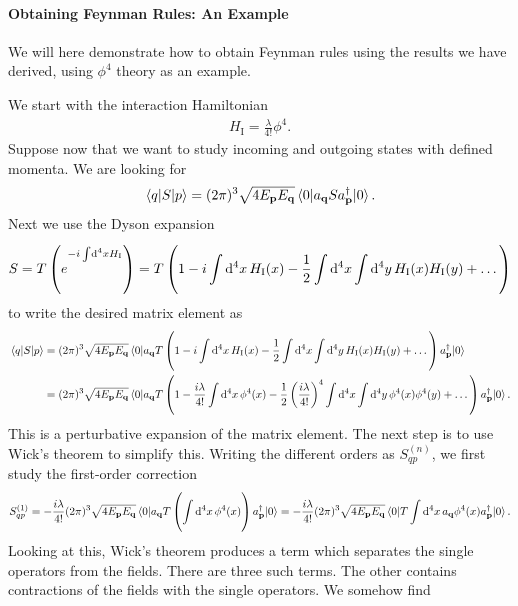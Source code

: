 \paragraph{Obtaining Feynman Rules: An Example}
We will here demonstrate how to obtain Feynman rules using the results we have derived, using $\phi^{4}$ theory as an example.

We start with the interaction Hamiltonian
\begin{align*}
	H_{\text{I}} = \frac{\lambda}{4!}\phi^{4}.
\end{align*}
Suppose now that we want to study incoming and outgoing states with defined momenta. We are looking for
\begin{align*}
	\mel{q}{S}{p} = (2\pi)^{3}\sqrt{4E_{\vb{p}}E_{\vb{q}}}\expval{a_{\vb{q}}Sa_{\vb{p}}\ensuremath{^{\dagger}}}{0}.
\end{align*}
Next we use the Dyson expansion
\begin{align*}
	S = T\left(e^{-i\int\limits_{}^{}\dd[4]{x}H_{\text{I}}}\right) = T\left(1 - i\int\limits_{}^{}\dd[4]{x}H_{\text{I}}(x) - \frac{1}{2}\int\limits_{}^{}\dd[4]{x}\int\limits_{}^{}\dd[4]{y}H_{\text{I}}(x)H_{\text{I}}(y) + \dots\right)
\end{align*}
to write the desired matrix element as
\begin{align*}
	\mel{q}{S}{p} &= (2\pi)^{3}\sqrt{4E_{\vb{p}}E_{\vb{q}}}\expval{a_{\vb{q}}\ensuremath{T}\left(1 - i\int\limits_{}^{}\dd[4]{x}H_{\text{I}}(x) - \frac{1}{2}\int\limits_{}^{}\dd[4]{x}\int\limits_{}^{}\dd[4]{y}H_{\text{I}}(x)H_{\text{I}}(y) + \dots\right)a_{\vb{p}}\ensuremath{^{\dagger}}}{0} \\
	              &= (2\pi)^{3}\sqrt{4E_{\vb{p}}E_{\vb{q}}}\expval{a_{\vb{q}}\ensuremath{T}\left(1 - \frac{i\lambda}{4!}\int\limits_{}^{}\dd[4]{x}\phi^{4}(x) - \frac{1}{2}\left(\frac{i\lambda}{4!}\right)^{4}\int\limits_{}^{}\dd[4]{x}\int\limits_{}^{}\dd[4]{y}\phi^{4}(x)\phi^{4}(y) + \dots\right)a_{\vb{p}}\ensuremath{^{\dagger}}}{0}.
\end{align*}
This is a perturbative expansion of the matrix element. The next step is to use Wick's theorem to simplify this. Writing the different orders as $S_{qp}^{(n)}$, we first study the first-order correction
\begin{align*}
	S_{qp}^{(1)} = -\frac{i\lambda}{4!}(2\pi)^{3}\sqrt{4E_{\vb{p}}E_{\vb{q}}}\expval{a_{\vb{q}}\ensuremath{T}\left(\int\limits_{}^{}\dd[4]{x}\phi^{4}(x)\right)a_{\vb{p}}\ensuremath{^{\dagger}}}{0} = -\frac{i\lambda}{4!}(2\pi)^{3}\sqrt{4E_{\vb{p}}E_{\vb{q}}}\expval{\ensuremath{T}\int\limits_{}^{}\dd[4]{x}a_{\vb{q}}\phi^{4}(x)a_{\vb{p}}\ensuremath{^{\dagger}}}{0}.
\end{align*}
Looking at this, Wick's theorem produces a term which separates the single operators from the fields. There are three such terms. The other contains contractions of the fields with the single operators. We somehow find
